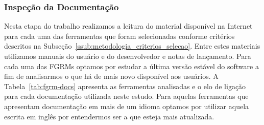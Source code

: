 \subsubsection{Inspeção da Documentação}
\label{subsec:inspecao_doumentacao}

Nesta etapa do trabalho realizamos a leitura do material disponível na Internet
para cada uma das ferramentas que foram selecionadas conforme critérios
descritos na Subseção~\ref{ssub:metodologia_criterios_selecao}. Entre estes
materiais utilizamos manuais do usuário e do desenvolvedor e notas de
lançamento. Para cada uma das FGRMs optamos por estudar a última versão estável
do software a fim de analisarmos o que há de mais novo disponível aos usuários.
A Tabela~\ref{tab:fgrm-docs} apresenta as ferramentas analisadas e o elo de
ligação para cada documentação utilizada neste estudo. Para aquelas ferramentas
que apresentam documentação em mais de um i\-di\-o\-ma optamos por utilizar
aquela escrita em inglês por entendermos ser a que esteja mais atualizada.

